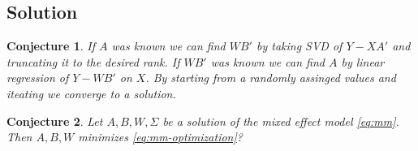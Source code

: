 \documentclass[preprint]{imsart}
\numberwithin{equation}{section}
\theoremstyle{plain}
\newtheorem{conjecture}{Conjecture}
\begin{document}
\subsection{Solution}

\begin{conjecture}\label{cj:solution}
If $A$ was known we can find $WB'$ by taking SVD of $Y - XA'$ and truncating it to the desired rank. If $WB'$ was known we can find $A$ by linear regression of $Y - WB'$ on $X$. By starting from a randomly assinged values and  iteating we converge to a solution.
\end{conjecture}

\begin{conjecture}
Let $A,B,W,\Sigma$ be a solution of the mixed effect model \eqref{eq:mm}. Then $A,B,W$ minimizes \eqref{eq:mm-optimization}? %
\end{conjecture}
\end{document}
